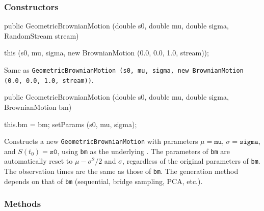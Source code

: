 \subsubsection* {Constructors}
\begin{code}

   public GeometricBrownianMotion (double s0, double mu, double sigma,
                                   RandomStream stream) \begin{hide} {
        this (s0, mu, sigma, new BrownianMotion (0.0, 0.0, 1.0, stream));
    }\end{hide}
\end{code}
\begin{tabb} 
Same as \texttt{GeometricBrownianMotion (s0, mu, sigma,
new BrownianMotion (0.0, 0.0, 1.0, stream))}.
\end{tabb}
\begin{code}

   public GeometricBrownianMotion (double s0, double mu, double sigma,
                                   BrownianMotion bm) \begin{hide} {
        this.bm = bm;
        setParams (s0, mu, sigma);
    }\end{hide}
\end{code}
\begin{tabb} 
Constructs a new \texttt{GeometricBrownianMotion} with parameters
 $\mu = \texttt{mu}$, $\sigma = \texttt{sigma}$, and $S(t_0) = \texttt{s0}$,
using \texttt{bm} as the underlying .
The parameters of \texttt{bm} are automatically reset to
$\mu-\sigma^2/2$ and $\sigma$, regardless of the original parameters
 of \texttt{bm}.
The observation times are the same as those of \texttt{bm}. The generation
method depends on that of \texttt{bm} (sequential, bridge sampling, PCA, etc.).
\end{tabb}

\subsubsection* {Methods}

